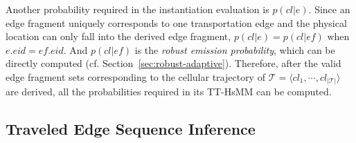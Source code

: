 \documentclass{vldb}
\begin{document}
	Another probability required in the instantiation evaluation is $p(cl|e)$.
	Since an edge fragment uniquely corresponds to one transportation edge and the physical location can only fall into the derived edge fragment, $p(cl|e)=p(cl|ef)$ when $e.eid=ef.eid$.
	And $p(cl|ef)$ is the {\it robust emission probability}, which can be directly computed (cf. Section~\ref{sec:robust-adaptive}).
	Therefore, after the valid edge fragment sets corresponding to the cellular trajectory of $\mathcal{T}=\langle cl_1,\cdots,cl_{|\mathcal{T}|}\rangle$ are derived, all the probabilities required in its TT-HsMM can be computed.
		
	\subsection{Traveled Edge Sequence Inference}
		
\end{document}
